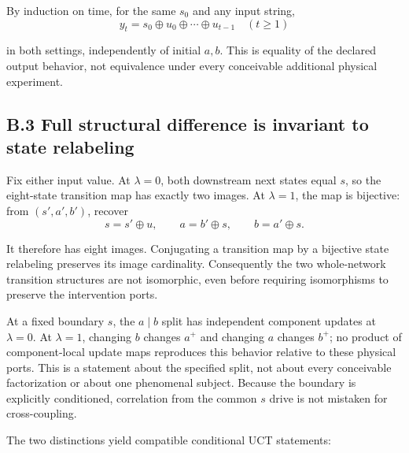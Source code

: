 \documentclass[
  11pt,
  a4paper,
]{article}
\begin{document}
By induction on time, for the same \(s_0\) and any input string,
\nopagebreak[4]
\[
y_t=s_0\oplus u_0\oplus\cdots\oplus u_{t-1}
\quad(t\ge1)
\]

in both settings, independently of initial \(a,b\). This is equality of
the declared output behavior, not equivalence under every conceivable
additional physical experiment.

\hypertarget{b.3-full-structural-difference-is-invariant-to-state-relabeling}{%
\subsection{B.3 Full structural difference is invariant to state
relabeling}\label{b.3-full-structural-difference-is-invariant-to-state-relabeling}}

Fix either input value. At \(\lambda=0\), both downstream next states
equal \(s\), so the eight-state transition map has exactly two images.
At \(\lambda=1\), the map is bijective: from \((s',a',b')\), recover
\nopagebreak[4]
\[
s=s'\oplus u,\qquad a=b'\oplus s,\qquad b=a'\oplus s.
\]

It therefore has eight images. Conjugating a transition map by a
bijective state relabeling preserves its image cardinality. Consequently
the two whole-network transition structures are not isomorphic, even
before requiring isomorphisms to preserve the intervention ports.

At a fixed boundary \(s\), the \(a\mid b\) split has independent
component updates at \(\lambda=0\). At \(\lambda=1\), changing \(b\)
changes \(a^+\) and changing \(a\) changes \(b^+\); no product of
component-local update maps reproduces this behavior relative to these
physical ports. This is a statement about the specified split, not about
every conceivable factorization or about one phenomenal subject. Because
the boundary is explicitly conditioned, correlation from the common
\(s\) drive is not mistaken for cross-coupling.

The two distinctions yield compatible conditional UCT statements:
\end{document}
